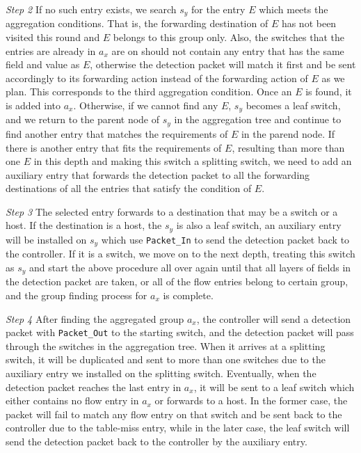 \documentclass[conference]{IEEEtran}
\begin{document}
\textit{Step 2}
If no such entry exists, we search $s_y$ for the entry $E$ which meets the aggregation conditions. That is, the forwarding destination of $E$ has not been visited this round and $E$ belongs to this group only. Also, the switches that the entries are already in $a_x$ are on should not contain any entry that has the same field and value as $E$, otherwise the detection packet will match it first and be sent accordingly to its forwarding action instead of the forwarding action of $E$ as we plan. This corresponds to the third aggregation condition. Once an $E$ is found, it is added into $a_x$. Otherwise, if we cannot find any $E$, $s_y$ becomes a leaf switch, and we return to the parent node of $s_y$ in the aggregation tree and continue to find another entry that matches the requirements of $E$ in the parend node. If there is another entry that fits the requirements of $E$, resulting than more than one $E$ in this depth and making this switch a splitting switch, we need to add an auxiliary entry that forwards the detection packet to all the forwarding destinations of all the entries that satisfy the condition of $E$.

\textit{Step 3}
The selected entry forwards to a destination that may be a switch or a host. If the destination is a host, the $s_y$ is also a leaf switch, an auxiliary entry will be installed on $s_y$ which use \texttt{Packet\_In} to send the detection packet back to the controller. If it is a switch, we move on to the next depth, treating this switch as $s_y$ and start the above procedure all over again until that all layers of fields in the detection packet are taken, or all of the flow entries belong to certain group, and the group finding process for $a_x$ is complete.

\textit{Step 4}
After finding the aggregated group $a_x$, the controller will send a detection packet with \texttt{Packet\_Out} to the starting switch, and the detection packet will pass through the switches in the aggregation tree. When it arrives at a splitting switch, it will be duplicated and sent to more than one switches due to the auxiliary entry we installed on the splitting switch. Eventually, when the detection packet reaches the last entry in $a_x$, it will be sent to a leaf switch which either contains no flow entry in $a_x$ or forwards to a host. In the former case, the packet will fail to match any flow entry on that switch and be sent back to the controller due to the table-miss entry, while in the later case, the leaf switch will send the detection packet back to the controller by the auxiliary entry. 
\end{document}
